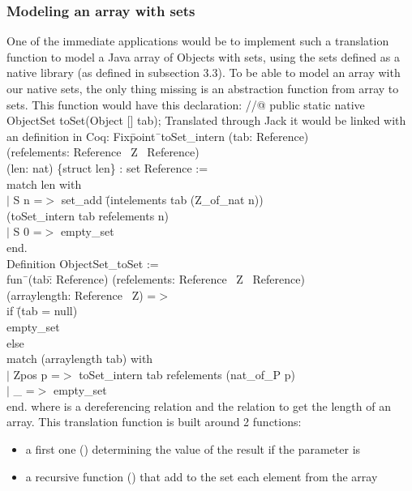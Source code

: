 \subsubsection{Modeling an array with sets}
One of the immediate applications would be to implement such a translation function to 
model a Java array of Objects with sets, using the sets defined as a native library 
(as defined in subsection 3.3).
To be able to model an array with our native sets, the only thing missing is
an abstraction function from array to sets. This function would have this declaration:
\btab
//@ public static native ObjectSet toSet(Object [] tab);
\etab
Translated through Jack it would be linked with an  definition in Coq:
\btab
Fix\=point\= \ toSet\_intern (tab: Reference)\\ 
\>(refelements: Reference \rarrow \ Z  \rarrow \ Reference)\+\\
\>(len: nat) \{struct len\} : set Reference :=\\
match len with\\
$|$ S n =$>$ set\_add \=(intelements tab (Z\_of\_nat n)) \\\>(toSet\_intern tab refelements n)\\
$|$ S 0 =$>$ empty\_set\\
end.\-\\
Definition ObjectSet\_toSet :=\+\\ 
fun\= \ (tab\=: Reference) 
(refelements: Reference \rarrow \ Z  \rarrow \ Reference) \+\\ \>
(arraylength: Reference \rarrow \ Z) =$>$ \\
if \=(tab = null)\\
 \> empty\_set\\
  else \+\\
match (arraylength tab) with\\
$|$ Zpos p =$>$ toSet\_intern tab refelements (nat\_of\_P p)\\
$|$ \_ =$>$ empty\_set\\
end.
\etab
where  is a dereferencing relation and  the relation to get the length of an array. This translation function is built around 2 functions:
\begin{itemize}
\item a first one () determining the value of the result if the  parameter is  
\item a recursive function () that add to the set each element from the array
\end{itemize}

